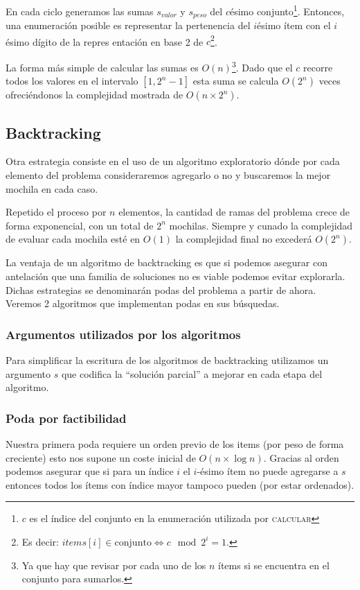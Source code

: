 \documentclass[fleqn, 11pt]{article}
\begin{document}
En cada ciclo generamos las sumas $s_{valor}$ y $s_{peso}$ del $c$ésimo
conjunto\footnote{$c$ es el índice del conjunto en la enumeración utilizada por
\textsc{calcular}}. Entonces, una enumeración posible es representar la
pertenencia del $i$ésimo ítem con el $i$ésimo dígito de la repres entación en
base 2 de $c$\footnote{Es decir: $items[i] \in \text{conjunto} \iff c \mod 2^i
= 1$.}.

La forma más simple de calcular las sumas es $O(n)$\footnote{Ya que hay que
revisar por cada uno de los $n$ ítems si se encuentra en el conjunto para
sumarlos.}.  Dado que el $c$ recorre todos los valores en el intervalo $[1,2^n
- 1]$ esta suma se calcula $O(2^n)$ veces ofreciéndonos la complejidad mostrada
de $O(n \times 2^n)$.

\subsection{Backtracking}

Otra estrategia consiste en el uso de un algoritmo exploratorio dónde por cada elemento del problema consideraremos agregarlo o no y buscaremos la mejor mochila en cada caso.

Repetido el proceso por $n$ elementos, la cantidad de ramas del problema crece de forma exponencial, con un total de $2^n$ mochilas. Siempre y cunado la complejidad de evaluar cada mochila esté en $O(1)$ la complejidad final no excederá $O(2^n)$.

La ventaja de un algoritmo de backtracking es que si podemos asegurar con antelación que una familia de soluciones no es viable podemos evitar explorarla. Dichas estrategias se denominarán podas del problema a partir de ahora. Veremos 2 algoritmos que implementan podas en sus búsquedas.

\subsubsection{Argumentos utilizados por los algoritmos}

Para simplificar la escritura de los algoritmos de backtracking utilizamos un
argumento $s$ que codifica la ``solución parcial'' a mejorar en cada etapa del
algoritmo. 

\subsubsection{Poda por factibilidad}

Nuestra primera poda requiere un orden previo de los items (por peso de forma creciente) esto nos supone un coste inicial de $O(n \times \log
n)$. Gracias al orden podemos asegurar que si para un índice $i$ el $i$-ésimo ítem no puede agregarse a $s$ entonces todos los ítems con índice mayor tampoco pueden (por estar ordenados).
\end{document}

